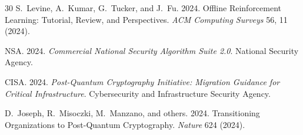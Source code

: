 \documentclass[sigconf,nonacm]{acmart}
\begin{document}
\begin{thebibliography}{30}
S.~Levine, A.~Kumar, G.~Tucker, and J.~Fu. 2024. Offline
Reinforcement Learning: Tutorial, Review, and Perspectives.
\textit{ACM Computing Surveys} 56, 11 (2024).

NSA. 2024. \textit{Commercial National Security Algorithm Suite 2.0}.
National Security Agency.

CISA. 2024. \textit{Post-Quantum Cryptography Initiative: Migration
Guidance for Critical Infrastructure}. Cybersecurity and Infrastructure
Security Agency.

D.~Joseph, R.~Misoczki, M.~Manzano, and others. 2024. Transitioning
Organizations to Post-Quantum Cryptography. \textit{Nature} 624 (2024).

\end{thebibliography}
\end{document}
